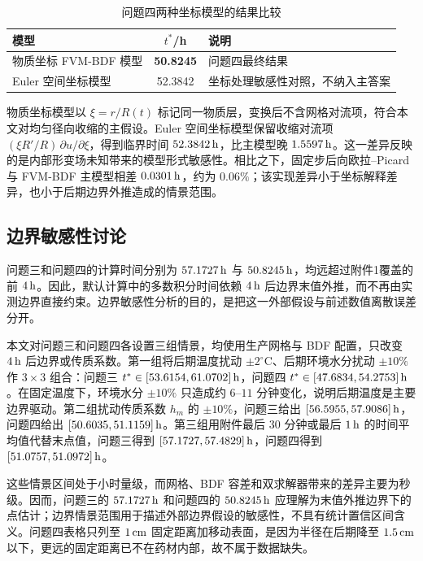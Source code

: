 \documentclass[UTF8,a4paper,12pt]{ctexart}
\numberwithin{equation}{section}
\begin{document}
\begin{table}[htbp]
  \centering
  \caption{问题四两种坐标模型的结果比较}
  \label{tab:q4-coord}
  \small
  \begin{tabular}{lcp{6.5cm}}
    \toprule
    模型 & $t^*$/h & 说明\\
    \midrule
    物质坐标 FVM-BDF 模型 & \textbf{50.8245} & 问题四最终结果\\
    Euler 空间坐标模型 & 52.3842 & 坐标处理敏感性对照，不纳入主答案\\
    \bottomrule
  \end{tabular}
\end{table}

物质坐标模型以 $\xi=r/R(t)$ 标记同一物质层，变换后不含网格对流项，符合本文对均匀径向收缩的主假设。Euler 空间坐标模型保留收缩对流项 $(\xi R'/R)\,\partial u/\partial\xi$，得到临界时间 $52.3842\rm\,h$，比主模型晚 $1.5597\rm\,h$。这一差异反映的是内部形变场未知带来的模型形式敏感性。相比之下，固定步后向欧拉--Picard 与 FVM-BDF 主模型相差 $0.0301\rm\,h$，约为 $0.06\%$；该实现差异小于坐标解释差异，也小于后期边界外推造成的情景范围。

\subsection{边界敏感性讨论}
问题三和问题四的计算时间分别为 $57.1727\rm\,h$ 与 $50.8245\rm\,h$，均远超过附件1覆盖的前 $4\rm\,h$。因此，默认计算中的多数积分时间依赖 $4\rm\,h$ 后边界末值外推，而不再由实测边界直接约束。边界敏感性分析的目的，是把这一外部假设与前述数值离散误差分开。

本文对问题三和问题四各设置三组情景，均使用生产网格与 BDF 配置，只改变 $4\rm\,h$ 后边界或传质系数。第一组将后期温度扰动 $\pm2^\circ\mathrm C$、后期环境水分扰动 $\pm10\%$ 作 $3\times3$ 组合：问题三 $t^*\in[53.6154,61.0702]\rm\,h$，问题四 $t^*\in[47.6834,54.2753]\rm\,h$。在固定温度下，环境水分 $\pm10\%$ 只造成约 $6$--$11$ 分钟变化，说明后期温度是主要边界驱动。第二组扰动传质系数 $h_m$ 的 $\pm10\%$，问题三给出 $[56.5955,57.9086]\rm\,h$，问题四给出 $[50.6035,51.1159]\rm\,h$。第三组用附件最后 $30$ 分钟或最后 $1\rm\,h$ 的时间平均值代替末点值，问题三得到 $[57.1727,57.4829]\rm\,h$，问题四得到 $[51.0757,51.0972]\rm\,h$。

这些情景区间处于小时量级，而网格、BDF 容差和双求解器带来的差异主要为秒级。因而，问题三的 $57.1727\rm\,h$ 和问题四的 $50.8245\rm\,h$ 应理解为末值外推边界下的点估计；边界情景范围用于描述外部边界假设的敏感性，不具有统计置信区间含义。问题四表格只列至 $1\rm\,cm$ 固定距离加移动表面，是因为半径在后期降至 $1.5\rm\,cm$ 以下，更远的固定距离已不在药材内部，故不属于数据缺失。
\end{document}
